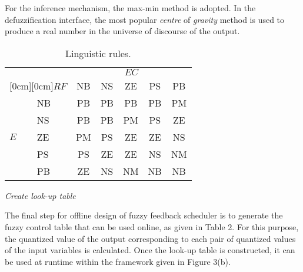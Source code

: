 \documentclass[12pt,a4paper]{ijicic}
\begin{document}
\begin{asparaenum}
For the inference mechanism, the max-min method is adopted. In the
defuzzification interface, the most popular \emph{centre} of
\emph{gravity} method is used to produce a real number in the
universe of discourse of the output.
\begin{table}[htb!]
\centering
\tabcolsep 3mm
\caption{Linguistic rules.}
\label{table:1}
\begin{center}
\begin{tabular}[b]{|l|l|c|c|c|c|c|}\hline
\multicolumn{2}{|c|}{}
&\multicolumn{5}{c|}{\parbox{8mm}{$EC$}} \\\cline{3-7}
\multicolumn{2}{|c|}{\raisebox{1.5ex}[0cm][0cm]{\parbox{5mm}{$RF$}}} & \parbox{5mm}{NB} & \parbox{5mm}{NS} & \parbox{5mm}{ZE} & \parbox{5mm}{PS} & \parbox{5mm}{PB} \\\hline
{}
& \parbox{5mm}{NB} & \parbox{5mm}{PB} & \parbox{5mm}{PB} & \parbox{5mm}{PB} & \parbox{5mm}{PB} & \parbox{5mm}{PM}  \\ 
& \parbox{5mm}{NS} & \parbox{5mm}{PB} & \parbox{5mm}{PB} & \parbox{5mm}{PM} & \parbox{5mm}{PS} & \parbox{5mm}{ZE}  \\ 
& \parbox{5mm}{ZE} & \parbox{5mm}{PM} & \parbox{5mm}{PS} & \parbox{5mm}{ZE} & \parbox{5mm}{ZE} & \parbox{5mm}{NS} \\ 
& \parbox{5mm}{PS} & \parbox{5mm}{PS} & \parbox{5mm}{ZE} & \parbox{5mm}{ZE} & \parbox{5mm}{NS} & \parbox{5mm}{NM} \\ 
& \parbox{5mm}{PB} & \parbox{5mm}{ZE} & \parbox{5mm}{NS} & \parbox{5mm}{NM} & \parbox{5mm}{NB} & \parbox{5mm}{NB} \\\hline
\end{tabular}
\end{center}
\end{table}

\item \emph{Create look-up table}

The final step for offline design of fuzzy feedback scheduler is to generate the
fuzzy control table that can be used online, as given in Table 2.
For this purpose, the quantized value of the output corresponding to
each pair of quantized values of the input variables is calculated. Once
the look-up table is constructed, it can be used at runtime within the framework
given in Figure 3(b).


\end{asparaenum}
\end{document}
